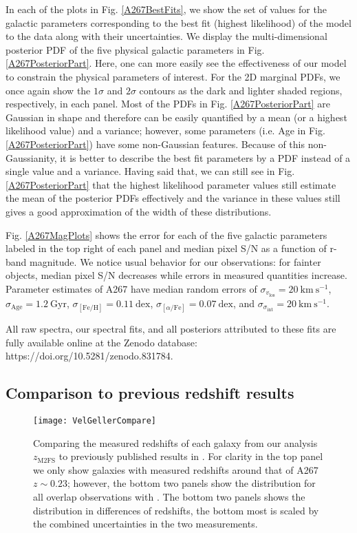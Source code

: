 \documentclass[twocolumn]{aastex6}
\def\feh{\mathrm{[Fe/H]}}
\def\age{\mathrm{Age}}
\begin{document}
In each of the plots in Fig. \ref{A267BestFits}, we show the set of values for the galactic parameters corresponding to the best fit (highest likelihood) of the model to the data along with their uncertainties.
We display the multi-dimensional posterior PDF of the five physical galactic parameters in Fig. \ref{A267PosteriorPart}.
Here, one can more easily see the effectiveness of our model to constrain the physical parameters of interest.
For the 2D marginal PDFs, we once again show the $1\sigma$ and $2\sigma$ contours as the dark and lighter shaded regions, respectively, in each panel.
Most of the PDFs in Fig. \ref{A267PosteriorPart} are Gaussian in shape and therefore can be easily quantified by a mean (or a highest likelihood value) and a variance; however, some parameters (i.e. Age in Fig. \ref{A267PosteriorPart}) have some non-Gaussian features.
Because of this non-Gaussianity, it is better to describe the best fit parameters by a PDF instead of a single value and a variance.
Having said that, we can still see in Fig. \ref{A267PosteriorPart} that the highest likelihood parameter values still estimate the mean of the posterior PDFs effectively and the variance in these values still gives a good approximation of the width of these distributions.

Fig. \ref{A267MagPlots} shows the error for each of the five galactic parameters labeled in the top right of each panel and median pixel S/N as a function of r-band magnitude.
We notice usual behavior for our observations: for fainter objects, median pixel S/N decreases while errors in measured quantities increase.
Parameter estimates of A267 have median random errors of $\sigma_{v_\mathrm{los}}=20\ \mathrm{km\ s^{-1}}$, $\sigma_\age=1.2\ \mathrm{Gyr}$, $\sigma_\feh=0.11\ \mathrm{dex}$, $\sigma_{[\alpha/\mathrm{Fe}]}=0.07\ \mathrm{dex}$, and $\sigma_{\sigma_\mathrm{int}}=20\ \mathrm{km\ s^{-1}}$.

All raw spectra, our spectral fits, and all posteriors attributed to these fits are fully available online at the Zenodo database: https://doi.org/10.5281/zenodo.831784.

\subsection{Comparison to previous redshift results}
\label{zComp}

\begin{figure}
\centering
\texttt{[image: VelGellerCompare]}
\caption{Comparing the measured redshifts of each galaxy from our analysis $z_\mathrm{M2FS}$ to previously published results in \citet{Rines2013}.  For clarity in the top panel we only show galaxies with measured redshifts around that of A267 $z\sim0.23$; however, the bottom two panels show the distribution for all overlap observations with \citet{Rines2013}. The bottom two panels shows the distribution in differences of redshifts, the bottom most is scaled by the combined uncertainties in the two measurements.}
\label{A267GellerCompare}
\end{figure}
\end{document}
